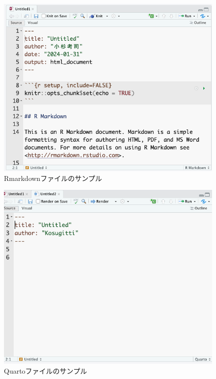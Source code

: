 \documentclass[
  a4paper,
]{ltjsbook}
\begin{document}
\begin{figure}[H]

{\centering \includegraphics{Figs/04_RmdSample.png}

}

\caption{Rmarkdownファイルのサンプル}

\end{figure}%
\begin{figure}[H]

{\centering \includegraphics{Figs/04_QmdSample.png}

}

\caption{Quartoファイルのサンプル}

\end{figure}%
\end{document}
